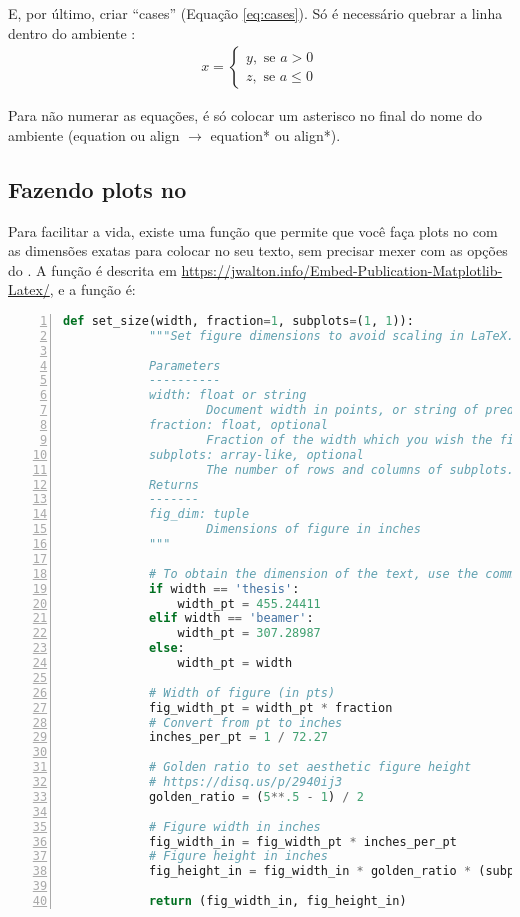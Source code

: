       E, por último, criar ``cases'' (Equação \eqref{eq:cases}). Só é necessário quebrar a linha dentro do ambiente :
      \begin{align}
        x =
        \begin{cases}
          y,\text{ se } a > 0 \\
          z,\text{ se } a \leq 0
        \end{cases}
        \label{eq:cases}
      \end{align}

      Para não numerar as equações, é só colocar um asterisco no final do nome do ambiente (equation ou align $\rightarrow$ equation* ou align*).

    \subsection{Fazendo plots no }
      Para facilitar a vida, existe uma função que permite que você faça plots no  com as dimensões exatas para colocar no seu texto, sem precisar mexer com as opções do . A função é descrita em \url{https://jwalton.info/Embed-Publication-Matplotlib-Latex/}, e a função é:
      \begin{lstlisting}[label=code, language=Python, numbers=left, autogobble]          
        def set_size(width, fraction=1, subplots=(1, 1)):
            """Set figure dimensions to avoid scaling in LaTeX.
        
            Parameters
            ----------
            width: float or string
                    Document width in points, or string of predined document type
            fraction: float, optional
                    Fraction of the width which you wish the figure to occupy
            subplots: array-like, optional
                    The number of rows and columns of subplots.
            Returns
            -------
            fig_dim: tuple
                    Dimensions of figure in inches
            """

            # To obtain the dimension of the text, use the command \the\linewidth somewhere in the TeX document
            if width == 'thesis':
                width_pt = 455.24411 
            elif width == 'beamer':
                width_pt = 307.28987
            else:
                width_pt = width
        
            # Width of figure (in pts)
            fig_width_pt = width_pt * fraction
            # Convert from pt to inches
            inches_per_pt = 1 / 72.27
        
            # Golden ratio to set aesthetic figure height
            # https://disq.us/p/2940ij3
            golden_ratio = (5**.5 - 1) / 2
        
            # Figure width in inches
            fig_width_in = fig_width_pt * inches_per_pt
            # Figure height in inches
            fig_height_in = fig_width_in * golden_ratio * (subplots[0] / subplots[1])
        
            return (fig_width_in, fig_height_in)
      \end{lstlisting}

